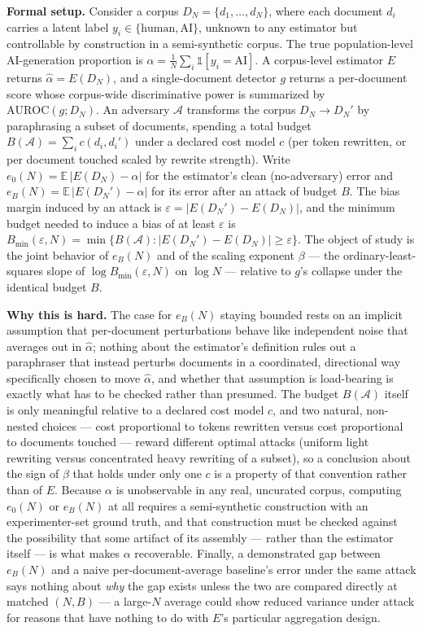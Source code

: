 \documentclass[11pt]{article}
\begin{document}
\noindent\textbf{Formal setup.} Consider a corpus $D_N = \{d_1, \dots, d_N\}$, where each document $d_i$ carries a latent label $y_i \in \{\text{human}, \text{AI}\}$, unknown to any estimator but controllable by construction in a semi-synthetic corpus. The true population-level AI-generation proportion is $\alpha = \frac{1}{N}\sum_i \mathbb{1}[y_i = \text{AI}]$. A corpus-level estimator $E$ returns $\hat\alpha = E(D_N)$, and a single-document detector $g$ returns a per-document score whose corpus-wide discriminative power is summarized by $\mathrm{AUROC}(g; D_N)$. An adversary $\mathcal{A}$ transforms the corpus $D_N \to D_N'$ by paraphrasing a subset of documents, spending a total budget $B(\mathcal{A}) = \sum_i c(d_i, d_i')$ under a declared cost model $c$ (per token rewritten, or per document touched scaled by rewrite strength). Write $e_0(N) = \mathbb{E}\,|E(D_N) - \alpha|$ for the estimator's clean (no-adversary) error and $e_B(N) = \mathbb{E}\,|E(D_N') - \alpha|$ for its error after an attack of budget $B$. The bias margin induced by an attack is $\varepsilon = |E(D_N') - E(D_N)|$, and the minimum budget needed to induce a bias of at least $\varepsilon$ is $B_{\min}(\varepsilon, N) = \min\{B(\mathcal{A}) : |E(D_N') - E(D_N)| \ge \varepsilon\}$. The object of study is the joint behavior of $e_B(N)$ and of the scaling exponent $\beta$ --- the ordinary-least-squares slope of $\log B_{\min}(\varepsilon, N)$ on $\log N$ --- relative to $g$'s collapse under the identical budget $B$.

\noindent\textbf{Why this is hard.} The case for $e_B(N)$ staying bounded rests on an implicit assumption that per-document perturbations behave like independent noise that averages out in $\hat\alpha$; nothing about the estimator's definition rules out a paraphraser that instead perturbs documents in a coordinated, directional way specifically chosen to move $\hat\alpha$, and whether that assumption is load-bearing is exactly what has to be checked rather than presumed. The budget $B(\mathcal{A})$ itself is only meaningful relative to a declared cost model $c$, and two natural, non-nested choices --- cost proportional to tokens rewritten versus cost proportional to documents touched --- reward different optimal attacks (uniform light rewriting versus concentrated heavy rewriting of a subset), so a conclusion about the sign of $\beta$ that holds under only one $c$ is a property of that convention rather than of $E$. Because $\alpha$ is unobservable in any real, uncurated corpus, computing $e_0(N)$ or $e_B(N)$ at all requires a semi-synthetic construction with an experimenter-set ground truth, and that construction must be checked against the possibility that some artifact of its assembly --- rather than the estimator itself --- is what makes $\alpha$ recoverable. Finally, a demonstrated gap between $e_B(N)$ and a naive per-document-average baseline's error under the same attack says nothing about \emph{why} the gap exists unless the two are compared directly at matched $(N, B)$ --- a large-$N$ average could show reduced variance under attack for reasons that have nothing to do with $E$'s particular aggregation design.
\end{document}
